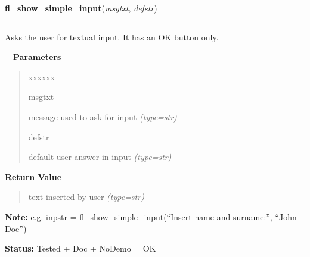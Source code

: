 \hspace{.8\funcindent}\begin{boxedminipage}{\funcwidth}

    \raggedright \textbf{fl\_show\_simple\_input}(\textit{msgtxt}, \textit{defstr})

    \vspace{-1.5ex}

    \rule{\textwidth}{0.5\fboxrule}
\setlength{\parskip}{2ex}

Asks the user for textual input. It has an OK button only.

-{}-
\setlength{\parskip}{1ex}
      \textbf{Parameters}
      \vspace{-1ex}

      \begin{quote}
        \begin{Ventry}{xxxxxx}

          \item[msgtxt]


message used to ask for input
            {\it (type=str)}

          \item[defstr]


default user answer in input
            {\it (type=str)}

        \end{Ventry}

      \end{quote}

      \textbf{Return Value}
    \vspace{-1ex}

      \begin{quote}

text inserted by user
      {\it (type=str)}

      \end{quote}

\textbf{Note:} 
e.g. inpstr = fl\_show\_simple\_input(``Insert name and surname:'',
``John Doe'')


\textbf{Status:} 
Tested + Doc + NoDemo = OK


    \end{boxedminipage}

    \label{xformslib:flgoodies:fl_show_colormap}

    \vspace{0.5ex}

